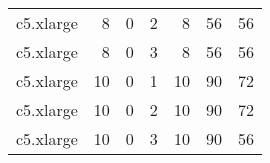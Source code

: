\begin{tabular}{lrrrrrr}
    c5.xlarge &           8 &            0 &       2 &                 8 &                   56 &                56 \\
    c5.xlarge &           8 &            0 &       3 &                 8 &                   56 &                56 \\
    c5.xlarge &          10 &            0 &       1 &                10 &                   90 &                72 \\
    c5.xlarge &          10 &            0 &       2 &                10 &                   90 &                72 \\
    c5.xlarge &          10 &            0 &       3 &                10 &                   90 &                56 \\
\bottomrule
\end{tabular}
